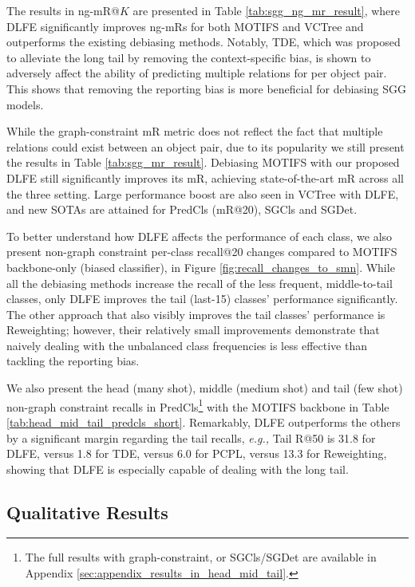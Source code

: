 \documentclass[sigconf]{acmart}
\begin{document}
The results in ng-mR@$K$ are presented in Table \ref{tab:sgg_ng_mr_result}, where DLFE significantly improves ng-mRs for both MOTIFS and VCTree and outperforms the existing debiasing methods.
Notably, TDE, which was proposed to alleviate the long tail by removing the context-specific bias, is shown to adversely affect the ability of predicting multiple relations for per object pair.
This shows that removing the reporting bias is more beneficial for debiasing SGG models.


While the graph-constraint mR metric does not reflect the fact that multiple relations could exist between an object pair, due to its popularity we still present the results in Table \ref{tab:sgg_mr_result}.
Debiasing MOTIFS with our proposed DLFE still significantly improves its mR, achieving state-of-the-art mR across all the three setting.
Large performance boost are also seen in VCTree with DLFE, and new SOTAs are attained for PredCls (mR@20), SGCls and SGDet.



To better understand how DLFE affects the performance of each class, we also present non-graph constraint per-class recall@20 changes compared to MOTIFS backbone-only (biased classifier), in Figure \ref{fig:recall_changes_to_smn}.
While all the debiasing methods increase the recall of the less frequent, middle-to-tail classes, only DLFE improves the tail (last-15) classes' performance significantly.
The other approach that also visibly improves the tail classes' performance is Reweighting; however, their relatively small improvements demonstrate that naively dealing with the unbalanced class frequencies is less effective than tackling the reporting bias.



We also present the head (many shot), middle (medium shot) and tail (few shot) non-graph constraint recalls in PredCls\footnote{The full results with graph-constraint, or SGCls/SGDet are available in Appendix \ref{sec:appendix_results_in_head_mid_tail}.} with the MOTIFS backbone in Table \ref{tab:head_mid_tail_predcls_short}.
Remarkably, DLFE outperforms the others by a significant margin regarding the tail recalls, \emph{e.g.,} Tail R@50 is 31.8 for DLFE, versus 1.8 for TDE, versus 6.0 for PCPL, versus 13.3 for Reweighting, showing that DLFE is especially capable of dealing with the long tail.

\subsection{Qualitative Results}
\label{sec:qualitative_results}
\end{document}
